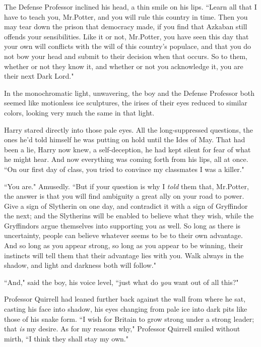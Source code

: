 The Defense Professor inclined his head, a thin smile on his lips. ``Learn all that I have to teach you, Mr.\?Potter, and you will rule this country in time. Then you may tear down the prison that democracy made, if you find that Azkaban still offends your sensibilities. Like it or not, Mr.\?Potter, you have seen this day that your own will conflicts with the will of this country's populace, and that you do not bow your head and submit to their decision when that occurs. So to them, whether or not they know it, and whether or not you acknowledge it, you are their next Dark Lord."

In the monochromatic light, unwavering, the boy and the Defense Professor both seemed like motionless ice sculptures, the irises of their eyes reduced to similar colors, looking very much the same in that light.

Harry stared directly into those pale eyes. All the long-suppressed questions, the ones he'd told himself he was putting on hold until the Ides of May. That had been a lie, Harry now knew, a self-deception, he had kept silent for fear of what he might hear. And now everything was coming forth from his lips, all at once. ``On our first day of class, you tried to convince my classmates I was a killer."

``You are." Amusedly. ``But if your question is why I \emph{told} them that, Mr.\?Potter, the answer is that you will find ambiguity a great ally on your road to power. Give a sign of Slytherin on one day, and contradict it with a sign of Gryffindor the next; and the Slytherins will be enabled to believe what they wish, while the Gryffindors argue themselves into supporting you as well. So long as there is uncertainty, people can believe whatever seems to be to their own advantage. And so long as you appear strong, so long as you appear to be winning, their instincts will tell them that their advantage lies with you. Walk always in the shadow, and light and darkness both will follow."

``And," said the boy, his voice level, ``just what do \emph{you} want out of all this?"

Professor Quirrell had leaned further back against the wall from where he sat, casting his face into shadow, his eyes changing from pale ice into dark pits like those of his snake form. ``I wish for Britain to grow strong under a strong leader; that \emph{is} my desire. As for my reasons why," Professor Quirrell smiled without mirth, ``I think they shall stay my own."

